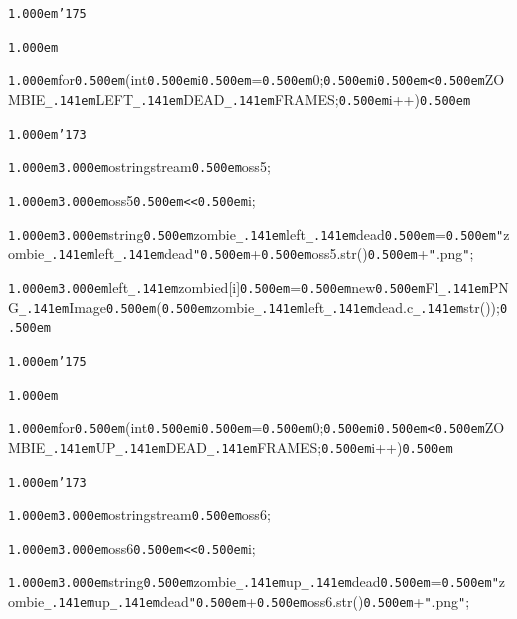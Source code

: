 \documentclass[12pt]{article}
\begin{document}
\noindent
{}{\tt\mc \kern1.000em}{\tt\char'175}

\noindent
{}{\tt\mc \kern1.000em}

\noindent
{}{\tt\mc \kern1.000em}for{\tt\mc \kern0.500em}(int{\tt\mc \kern0.500em}i{\tt\mc \kern0.500em}={\tt\mc \kern0.500em}0;{\tt\mc \kern0.500em}i{\tt\mc \kern0.500em}{\tt <}{\tt\mc \kern0.500em}ZOMBIE{\tt\_\kern.141em}LEFT{\tt\_\kern.141em}DEAD{\tt\_\kern.141em}FRAMES;{\tt\mc \kern0.500em}i++){\tt\mc \kern0.500em}

\noindent
{}{\tt\mc \kern1.000em}{\tt\char'173}

\noindent
{}{\tt\mc \kern1.000em}{\tt\mc \kern3.000em}ostringstream{\tt\mc \kern0.500em}oss5;

\noindent
{}{\tt\mc \kern1.000em}{\tt\mc \kern3.000em}oss5{\tt\mc \kern0.500em}{\tt <}{\tt <}{\tt\mc \kern0.500em}i;

\noindent
{}{\tt\mc \kern1.000em}{\tt\mc \kern3.000em}string{\tt\mc \kern0.500em}zombie{\tt\_\kern.141em}left{\tt\_\kern.141em}dead{\tt\mc \kern0.500em}={\tt\mc \kern0.500em}{\tt "}zombie{\tt\_\kern.141em}left{\tt\_\kern.141em}dead{\tt "}{\tt\mc \kern0.500em}+{\tt\mc \kern0.500em}oss5.str(){\tt\mc \kern0.500em}+{\tt "}.png{\tt "};

\noindent
{}{\tt\mc \kern1.000em}{\tt\mc \kern3.000em}left{\tt\_\kern.141em}zombied[i]{\tt\mc \kern0.500em}={\tt\mc \kern0.500em}new{\tt\mc \kern0.500em}Fl{\tt\_\kern.141em}PNG{\tt\_\kern.141em}Image{\tt\mc \kern0.500em}({\tt\mc \kern0.500em}zombie{\tt\_\kern.141em}left{\tt\_\kern.141em}dead.c{\tt\_\kern.141em}str());{\tt\mc \kern0.500em}

\noindent
{}{\tt\mc \kern1.000em}{\tt\char'175}

\noindent
{}{\tt\mc \kern1.000em}

\noindent
{}{\tt\mc \kern1.000em}for{\tt\mc \kern0.500em}(int{\tt\mc \kern0.500em}i{\tt\mc \kern0.500em}={\tt\mc \kern0.500em}0;{\tt\mc \kern0.500em}i{\tt\mc \kern0.500em}{\tt <}{\tt\mc \kern0.500em}ZOMBIE{\tt\_\kern.141em}UP{\tt\_\kern.141em}DEAD{\tt\_\kern.141em}FRAMES;{\tt\mc \kern0.500em}i++){\tt\mc \kern0.500em}

\noindent
{}{\tt\mc \kern1.000em}{\tt\char'173}

\noindent
{}{\tt\mc \kern1.000em}{\tt\mc \kern3.000em}ostringstream{\tt\mc \kern0.500em}oss6;

\noindent
{}{\tt\mc \kern1.000em}{\tt\mc \kern3.000em}oss6{\tt\mc \kern0.500em}{\tt <}{\tt <}{\tt\mc \kern0.500em}i;

\noindent
{}{\tt\mc \kern1.000em}{\tt\mc \kern3.000em}string{\tt\mc \kern0.500em}zombie{\tt\_\kern.141em}up{\tt\_\kern.141em}dead{\tt\mc \kern0.500em}={\tt\mc \kern0.500em}{\tt "}zombie{\tt\_\kern.141em}up{\tt\_\kern.141em}dead{\tt "}{\tt\mc \kern0.500em}+{\tt\mc \kern0.500em}oss6.str(){\tt\mc \kern0.500em}+{\tt "}.png{\tt "};
\end{document}
